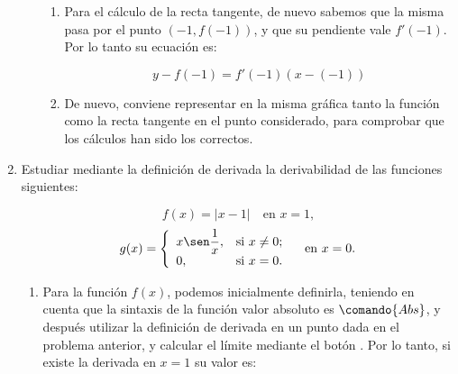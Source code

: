 \begin{enumerate}[leftmargin=*]
\begin{enumerate}
\begin{indicacion}
{\begin{enumerate}
\[
f'(a) = \mathop {\lim }\limits_{h \to 0} \frac{{f(a + h) - f(a)}}
{h}
\]
en donde, por aligerar la notación, hemos llamado $h$ a lo que en la
teoría denominábamos $\Delta x$.

Por lo tanto, para calcular la derivada de la función $f$ en $a=-1$
mediante la definición, procedemos con:

\[
f'(-1) = \mathop {\lim }\limits_{h \to 0} \frac{{f(-1 + h) - f(-1)}}
{h}
\]

Para calcular el límite, podemos utilizar el botón  de la barra de botones.

\item Para el cálculo de la recta tangente, de nuevo sabemos que
la misma pasa por el punto $(-1, f(-1))$, y que su pendiente vale
$f'(-1)$. Por lo tanto su ecuación es:

\[
y - f( - 1) = f'(-1)\left( {x - ( - 1)} \right)
\]

\item De nuevo, conviene representar en la misma gráfica tanto la
función como la recta tangente en el punto considerado, para
comprobar que los cálculos han sido los correctos.

\end{enumerate}
}
\end{indicacion}


\end{enumerate}




\item Estudiar mediante la definición de derivada la derivabilidad
de las funciones siguientes:


\[
f(x)=|x-1| \quad \textrm{en $x=1$,}
\]
\[
g(x)=\left\{%
\begin{array}{ll}
   x \sen\dfrac{1}{x}, & \hbox{si $x\neq 0$;} \\
   0, & \hbox{si $x=0$.} \\
\end{array}%
\right. \quad \textrm{en $x=0$.}
\]

\begin{indicacion}
{
\begin{enumerate}
\item Para la función $f(x)$, podemos inicialmente definirla,
teniendo en cuenta que la sintaxis de la función valor absoluto es
$\comando{Abs}$, y después utilizar la definición de derivada en un
punto dada en el problema anterior, y calcular el límite mediante el
botón . Por lo tanto, si existe la
derivada en $x=1$ su valor es:



\end{enumerate}}
\end{indicacion}
\end{enumerate}
